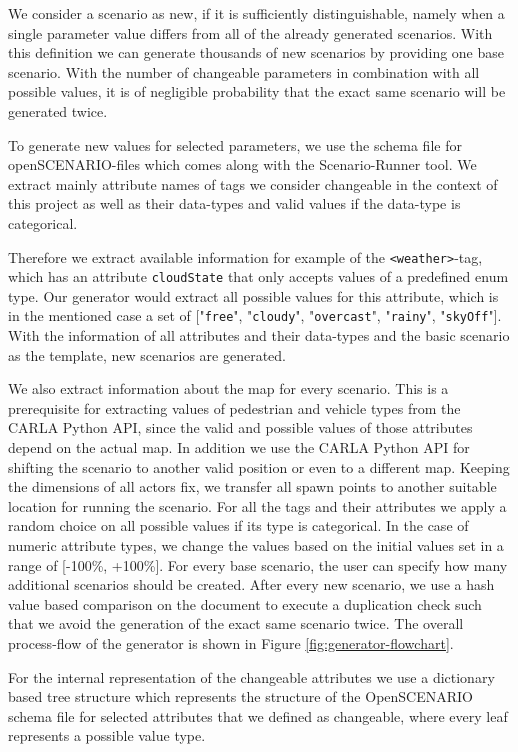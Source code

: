 \documentclass[conference, a4paper, 11pt]{IEEEtran}
\begin{document}
	We consider a scenario as new, if it is sufficiently distinguishable, namely when a single parameter value differs from all of the already generated scenarios. With this definition we can generate thousands of new scenarios by providing one base scenario. With the number of changeable parameters in combination with all possible values, it is of negligible probability that the exact same scenario will be generated twice.
	
	To generate new values for selected parameters, we use the schema file for openSCENARIO-files which comes along with the Scenario-Runner tool. We extract mainly attribute names of tags we consider changeable in the context of this project as well as their data-types and valid values if the data-type is categorical.
	
	Therefore we extract available information for example of the \texttt{<weather>}-tag, which has an attribute \texttt{cloudState} that only accepts values of a predefined enum type. Our generator would extract all possible values for this attribute,  which is in the mentioned case a set of ["\texttt{free}", "\texttt{cloudy}", "\texttt{overcast}", "\texttt{rainy}", "\texttt{skyOff}"]. With the information of all attributes and their data-types and the basic scenario as the template, new scenarios are generated. 
	
	We also extract information about the map for every scenario. This is a prerequisite for extracting values of pedestrian and vehicle types from the CARLA Python API, since the valid and possible values of those attributes depend on the actual map. In addition we use the CARLA Python API for shifting the scenario to another valid position or even to a different map. Keeping the dimensions of all actors fix, we transfer all spawn points to another suitable location for running the scenario.
	For all the tags and their attributes we apply a random choice on all possible values if its type is categorical. In the case of numeric attribute types, we change the values based on the initial values set in a range of [-100\%, +100\%].
	For every base scenario, the user can specify how many additional scenarios should be created. After every new scenario, we use a hash value based comparison on the document to execute a duplication check such that we avoid the generation of the exact same scenario twice.
	The overall process-flow of the generator is shown in Figure \ref{fig:generator-flowchart}.
	
	For the internal representation of the changeable attributes we use a dictionary based tree structure which represents the structure of the OpenSCENARIO schema file for selected attributes that we defined as changeable, where every leaf represents a possible value type.
	
\end{document}
